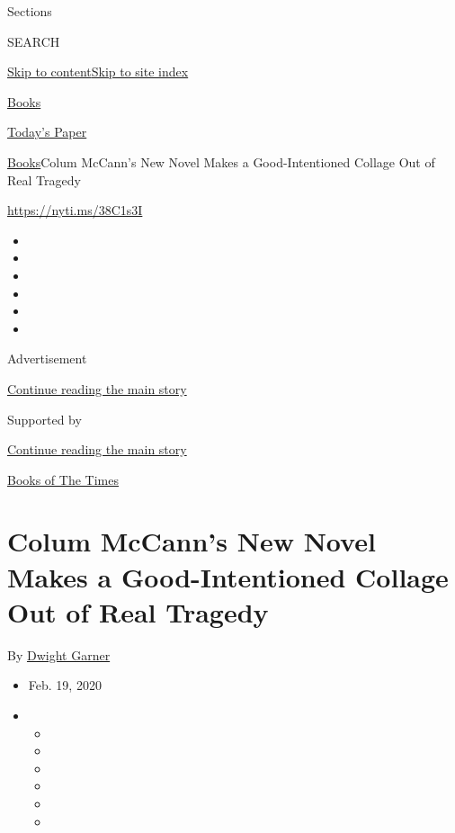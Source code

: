 Sections

SEARCH

\protect\hyperlink{site-content}{Skip to
content}\protect\hyperlink{site-index}{Skip to site index}

\href{https://www.nytimes.com/section/books}{Books}

\href{https://myaccount.nytimes.com/auth/login?response_type=cookie\&client_id=vi}{}

\href{https://www.nytimes.com/section/todayspaper}{Today's Paper}

\href{/section/books}{Books}\textbar{}Colum McCann's New Novel Makes a
Good-Intentioned Collage Out of Real Tragedy

\url{https://nyti.ms/38C1s3I}

\begin{itemize}
\item
\item
\item
\item
\item
\item
\end{itemize}

Advertisement

\protect\hyperlink{after-top}{Continue reading the main story}

Supported by

\protect\hyperlink{after-sponsor}{Continue reading the main story}

\href{/column/books-of-the-times}{Books of The Times}

\hypertarget{colum-mccanns-new-novel-makes-a-good-intentioned-collage-out-of-real-tragedy}{%
\section{Colum McCann's New Novel Makes a Good-Intentioned Collage Out
of Real
Tragedy}\label{colum-mccanns-new-novel-makes-a-good-intentioned-collage-out-of-real-tragedy}}

By \href{https://www.nytimes.com/by/dwight-garner}{Dwight Garner}

\begin{itemize}
\item
  Feb. 19, 2020
\item
  \begin{itemize}
  \item
  \item
  \item
  \item
  \item
  \item
  \end{itemize}
\end{itemize}

